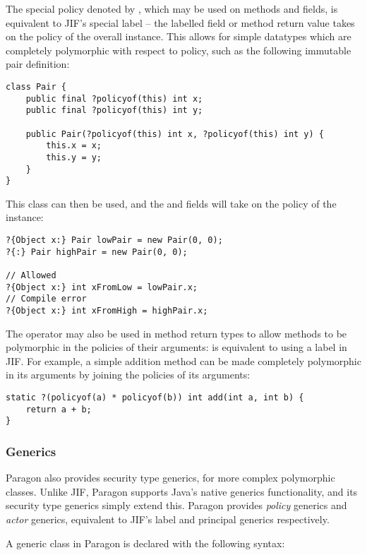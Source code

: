 The special policy denoted by , which may be used on methods and  fields, is equivalent to JIF's special  label -- the labelled field or method return value takes on the policy of the overall instance. This allows for simple datatypes which are completely polymorphic with respect to policy, such as the following immutable pair definition:

\begin{verbatim}
class Pair {
	public final ?policyof(this) int x;
	public final ?policyof(this) int y;
	
	public Pair(?policyof(this) int x, ?policyof(this) int y) {
		this.x = x;
		this.y = y;
	} 
}
\end{verbatim}

This class can then be used, and the  and  fields will take on the policy of the instance:

\begin{verbatim}
?{Object x:} Pair lowPair = new Pair(0, 0);
?{:} Pair highPair = new Pair(0, 0);

// Allowed
?{Object x:} int xFromLow = lowPair.x;
// Compile error
?{Object x:} int xFromHigh = highPair.x;
\end{verbatim}

The  operator may also be used in method return types to allow methods to be polymorphic in the policies of their arguments:  is equivalent to using a  label in JIF. For example, a simple addition method can be made completely polymorphic in its arguments by joining the policies of its arguments:

\begin{verbatim}
static ?(policyof(a) * policyof(b)) int add(int a, int b) {
	return a + b;
}
\end{verbatim}

\subsubsection{Generics}

Paragon also provides security type generics, for more complex polymorphic classes. Unlike JIF, Paragon supports Java's native generics functionality, and its security type generics simply extend this. Paragon provides \textit{policy} generics and \textit{actor} generics, equivalent to JIF's label and principal generics respectively.

A generic class in Paragon is declared with the following syntax:

